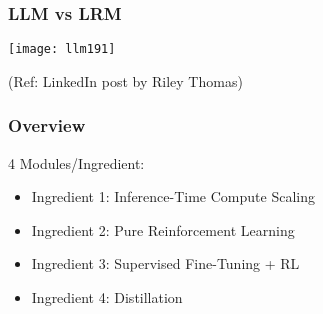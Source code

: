\begin{frame}[fragile]\frametitle{LLM vs LRM}

		\begin{center}
		\texttt{[image: llm191]}
		
		{\tiny (Ref: LinkedIn post by Riley Thomas)}

		\end{center}	

\end{frame}

\begin{frame}[fragile]\frametitle{Overview }

4 Modules/Ingredient: 

		\begin{itemize}
		  \item Ingredient 1: Inference-Time Compute Scaling
		  \item Ingredient 2: Pure Reinforcement Learning
		  \item Ingredient 3: Supervised Fine-Tuning + RL
		  \item Ingredient 4: Distillation
		\end{itemize}
\end{frame}


